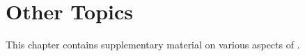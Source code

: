 \chapter{Other Topics}
\label{chap:other}

This chapter contains supplementary material on various aspects of
\vtyui.



